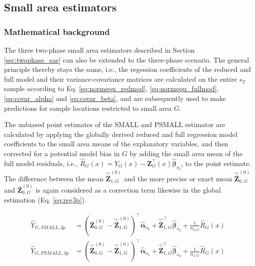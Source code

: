 \documentclass[article]{jss}
\begin{document}

\subsection{Small area estimators}
\label{sec:threephase_sae}

\subsubsection{Mathematical background}

The three two-phase small area estimators described in Section \ref{sec:twophase_sae} can also be extended to the three-phase scenario. The general principle thereby stays the same, i.e., the regession coefficients of the reduced and full model and their variance-covariance matrices are calculated on the entire $s_2$ sample according to Eq. \ref{eq:normequ_redmod}, \ref{eq:normequ_fullmod}, \ref{eq:covar_alpha} and \ref{eq:covar_beta}, and are subsequently used to make predictions for sample locations restricted to small area $G$.



The unbiased point estimates of the SMALL and PSMALL estimator are calculated by applying the globally derived reduced and full regression model coefficients to the small area means of the explanatory variables, and then corrected for a potential model bias in $G$ by adding the small area mean of the full model residuals, i.e., $\hat{R}_{G}(x)=Y_G(x)-\pmb{Z}_G^{\top}(x)\hat{\pmb{\beta}}_{s_2}$, to the point estimate. The difference between the mean $\hat{\bar{\pmb{Z}}}^{(0)}_{1,G}$ and the more precise or exact mean $\hat{\bar{\pmb{Z}}}^{(0)}_{0,G}$ and $\bar{\pmb{Z}}^{(0)}_{0,G}$ is again considered as a correction term likewise in the global estimation (Eq. \ref{eq:reg3p}).

\begin{subequations}\label{eq:pest_3p_small_psmall}
\begin{align}
\hat{Y}_{G,SMALL,3p}&=(\bar{\pmb{Z}}^{(0)}_{0,G}-\hat{\bar{\pmb{Z}}}^{(0)}_{1,G})^{\top}\hat{\pmb{\alpha}}_{s_2} +
\hat{\bar{\pmb{Z}}}^{\top}_{1,G}\hat{\pmb{\beta}}_{s_2}+\frac{1}{n_{2,G}}\hat{R}_{G}(x) \label{eq:pe_3p_small} \\
\hat{Y}_{G,PSMALL,3p}&=(\hat{\bar{\pmb{Z}}}^{(0)}_{0,G}-\hat{\bar{\pmb{Z}}}^{(0)}_{1,G})^{\top}\hat{\pmb{\alpha}}_{s_2} +
\hat{\bar{\pmb{Z}}}^{\top}_{1,G}\hat{\pmb{\beta}}_{s_2}+\frac{1}{n_{2,G}}\hat{R}_{G}(x) \label{eq:pe_3p_psmall}
\end{align}
\end{subequations}
\end{document}
